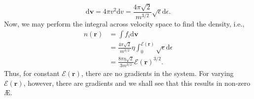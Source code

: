 \begin{equation}
    \mathrm{d}\boldsymbol{v}=4\pi v^2 \mathrm{d}v = \frac{4 \pi \sqrt{2}}{m^{3/2}} \sqrt{\epsilon} \mathrm{d} \epsilon.
\end{equation}
Now, we may perform the integral across velocity space to find the density, i.e.,
\begin{equation}
\begin{aligned}
    n(\boldsymbol{r}) &= \int f_i \mathrm{d} \boldsymbol{v} \\ 
    &= \frac{4 \pi \sqrt{2}}{m^{3/2}} \eta \int_{0}^{\mathcal{E}(\boldsymbol{r})} \sqrt{\epsilon} \mathrm{d} \epsilon \\ 
    &= \frac{8 \pi \eta \sqrt{2}}{3 m^{3/2}} \mathcal{E}(\boldsymbol{r})^{3/2}.
\end{aligned}
\end{equation}
Thus, for constant $\mathcal{E}(\boldsymbol{r})$, there are no gradients in the system. For varying $\mathcal{E}(\boldsymbol{r})$, however, there are gradients and we shall see that this results in non-zero \AE{}.

